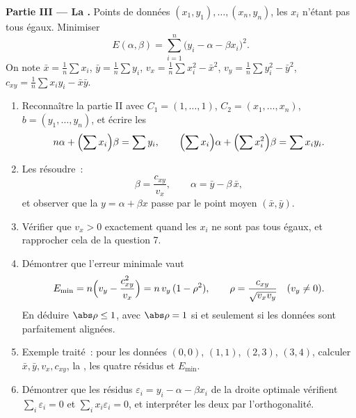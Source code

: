 \begin{problem}
\medskip
\noindent\textbf{Partie III --- La .} Points
de données $(x_1, y_1), \dots, (x_n, y_n)$, les $x_i$ n'étant pas
tous égaux. Minimiser
\[
E(\alpha, \beta) = \sum_{i=1}^{n}\bigl(y_i - \alpha - \beta
x_i\bigr)^2 .
\]
On note $\bar x = \frac1n\sum x_i$, $\bar y = \frac1n\sum y_i$,
$v_x = \frac1n\sum x_i^2 - \bar x^2$, $v_y = \frac1n\sum y_i^2 -
\bar y^2$, $c_{xy} = \frac1n\sum x_i y_i - \bar x\bar y$.
\begin{enumerate}[resume]
  \item Reconnaître la partie II avec $C_1 = (1, \dots, 1)$, $C_2
        = (x_1, \dots, x_n)$, $b = (y_1, \dots, y_n)$, et écrire
        les 
        \[
        n\alpha + \Bigl(\sum x_i\Bigr)\beta = \sum y_i,
        \qquad
        \Bigl(\sum x_i\Bigr)\alpha + \Bigl(\sum
        x_i^2\Bigr)\beta = \sum x_i y_i .
        \]
  \item Les résoudre~:
        \[
        \beta = \frac{c_{xy}}{v_x},
        \qquad
        \alpha = \bar y - \beta\,\bar x ,
        \]
        et observer que la \emph{} $y = \alpha
        + \beta x$ passe par le point moyen $(\bar x, \bar
        y)$.
  \item Vérifier que $v_x > 0$ exactement quand les $x_i$ ne sont
        pas tous égaux, et rapprocher cela de la question 7.
  \item Démontrer que l'erreur minimale vaut
        \[
        E_{\min} = n\Bigl(v_y - \frac{c_{xy}^2}{v_x}\Bigr)
        = n\,v_y\,(1 - \rho^2),
        \qquad
        \rho = \frac{c_{xy}}{\sqrt{v_x v_y}}
        \quad (v_y \neq 0).
        \]
        En déduire $\abs\rho \leq 1$, avec $\abs\rho = 1$ si et
        seulement si les données sont parfaitement alignées.
  \item Exemple traité~: pour les données $(0,0)$, $(1,1)$,
        $(2,3)$, $(3,4)$, calculer $\bar x, \bar y, v_x, c_{xy}$,
        la , les quatre résidus et $E_{\min}$.
  \item Démontrer que les résidus $\varepsilon_i = y_i - \alpha -
        \beta x_i$ de la droite optimale vérifient $\sum_i
        \varepsilon_i = 0$ et $\sum_i x_i\varepsilon_i = 0$,
        et interpréter les deux par l'orthogonalité.
\end{enumerate}


\end{problem}
